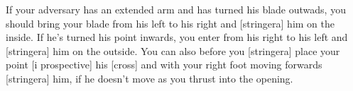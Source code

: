 \newpage


\newpage


If your adversary has an extended arm and has turned his blade
outwads, you should bring your blade from his left to his right and
[stringera] him on the inside. If he's turned his point inwards, you
enter from his right to his left and [stringera] him on the
outside. You can also before you [stringera] place your point [i
prospective] his [cross] and with your right foot moving forwards
[stringera] him, if he doesn't move as you thrust into the opening.


%
